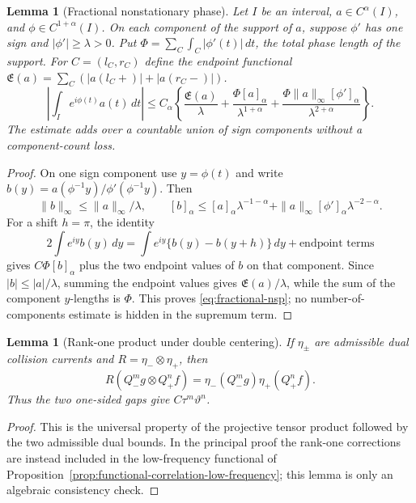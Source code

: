 \documentclass[11pt]{article}
\newtheorem{lemma}[theorem]{Lemma}
\begin{document}
\begin{lemma}[Fractional nonstationary phase]
\label{lem:fractional-nonstationary-phase}
Let \(I\) be an interval, \(a\in C^\alpha(I)\), and
\(\phi\in C^{1+\alpha}(I)\).  On each component of the support of \(a\),
suppose \(\phi'\) has one sign and \(|\phi'|\ge\lambda>0\).  Put
\(\Phi=\sum_C\int_C|\phi'(t)|\,dt\), the total phase length of the support.
For $C=(l_C,r_C)$ define the endpoint functional
$\mathfrak E(a)=\sum_C(|a(l_C+)|+|a(r_C-)|)$.
\begin{equation}
\label{eq:fractional-nsp}
 \left|\int_Ie^{i\phi(t)}a(t)\,dt\right|
 \le C_\alpha\left\{
 \frac{\mathfrak E(a)}{\lambda}
 +\frac{\Phi[a]_\alpha}{\lambda^{1+\alpha}}
 +\frac{\Phi\|a\|_\infty[\phi']_\alpha}
             {\lambda^{2+\alpha}}\right\}.
\end{equation}
The estimate adds over a countable union of sign components without a
component-count loss.
\end{lemma}

\begin{proof}
On one sign component use \(y=\phi(t)\) and write
\(b(y)=a(\phi^{-1}y)/\phi'(\phi^{-1}y)\).  Then
\[
 \|b\|_\infty\le\|a\|_\infty/\lambda,\qquad
 [b]_\alpha\le
 [a]_\alpha\lambda^{-1-\alpha}
 +\|a\|_\infty[\phi']_\alpha\lambda^{-2-\alpha}.
\]
For a shift \(h=\pi\), the identity
\[
 2\int e^{iy}b(y)\,dy
 =\int e^{iy}\{b(y)-b(y+h)\}\,dy+\text{endpoint terms}
\]
gives $C\Phi[b]_\alpha$ plus the two endpoint values of $b$ on that
component.  Since $|b|\le |a|/\lambda$, summing the endpoint values gives
$\mathfrak E(a)/\lambda$, while the sum of the component $y$-lengths is
$\Phi$.  This proves \eqref{eq:fractional-nsp}; no number-of-components
estimate is hidden in the supremum term.
\end{proof}

\begin{lemma}[Rank-one product under double centering]
\label{lem:rank-one-product}
If \(\eta_\pm\) are admissible dual collision currents and
\(R=\eta_-\otimes\eta_+\), then
\[
 R(Q_-^mg\otimes Q_+^nf)
 =\eta_-(Q_-^mg)\eta_+(Q_+^nf).
\]
Thus the two one-sided gaps give \(C\tau^m\vartheta^n\).
\end{lemma}

\begin{proof}
This is the universal property of the projective tensor product followed by
the two admissible dual bounds.  In the principal proof the rank-one
corrections are instead included in the low-frequency functional of
Proposition~\ref{prop:functional-correlation-low-frequency}; this lemma is
only an algebraic consistency check.
\end{proof}
\end{document}
